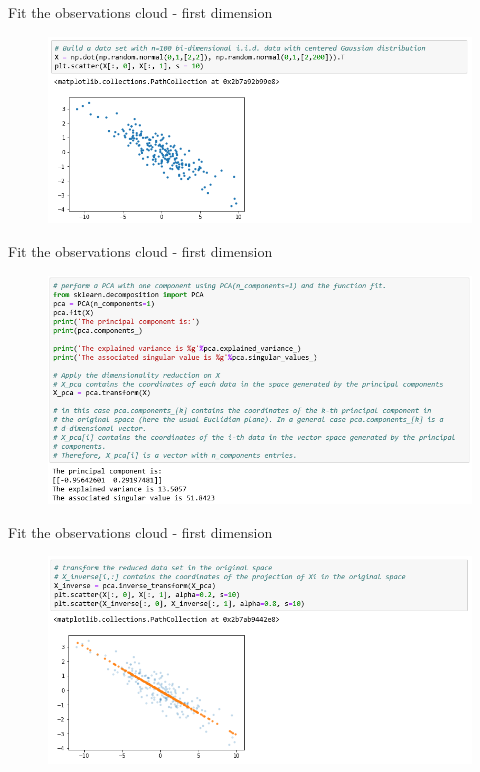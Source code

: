 \documentclass[9pt]{beamer}
\begin{document}
\begin{frame}{Fit the observations cloud - first dimension}
\begin{figure}
\begin{center}
\includegraphics[scale = .55]{./pca_1comp_1.png}
\end{center}
\end{figure}
\end{frame}

\begin{frame}{Fit the observations cloud - first dimension}
\begin{figure}
\begin{center}
\includegraphics[scale = .55]{./pca_1comp_2.png}
\end{center}
\end{figure}
\end{frame}

\begin{frame}{Fit the observations cloud - first dimension}
\begin{figure}
\begin{center}
\includegraphics[scale = .55]{./pca_1comp_3.png}
\end{center}
\end{figure}
\end{frame}
\end{document}
